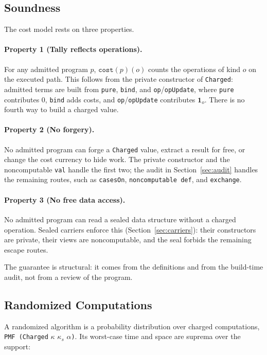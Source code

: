 \documentclass[acmsmall,nonacm]{acmart}
\begin{document}
\subsection{Soundness}\label{sec:soundness}

The cost model rests on three properties.

\paragraph{Property 1 (Tally reflects operations).}
For any admitted program $p$, $\texttt{cost}(p)(o)$ counts the operations of kind $o$ on the executed path.
This follows from the private constructor of \lstinline{Charged}: admitted terms are built from \lstinline{pure}, \lstinline{bind}, and \lstinline{op}/\lstinline{opUpdate}, where \lstinline{pure} contributes 0, \lstinline{bind} adds costs, and \lstinline{op}/\lstinline{opUpdate} contributes $\mathbf{1}_o$.
There is no fourth way to build a charged value.

\paragraph{Property 2 (No forgery).}
No admitted program can forge a \lstinline{Charged} value, extract a result for free, or change the cost currency to hide work.
The private constructor and the noncomputable \lstinline{val} handle the first two; the audit in Section~\ref{sec:audit} handles the remaining routes, such as \lstinline{casesOn}, \lstinline{noncomputable def}, and \lstinline{exchange}.

\paragraph{Property 3 (No free data access).}
No admitted program can read a sealed data structure without a charged operation.
Sealed carriers enforce this (Section~\ref{sec:carriers}): their constructors are private, their views are noncomputable, and the seal forbids the remaining escape routes.

The guarantee is structural: it comes from the definitions and from the build-time audit, not from a review of the program.

\subsection{Randomized Computations}\label{sec:randomised}

A randomized algorithm is a probability distribution over charged computations,
\lstinline{PMF (Charged} $\kappa$ $\kappa_s$ $\alpha$\lstinline{)}.
Its worst-case time and space are suprema over the support:
\end{document}
